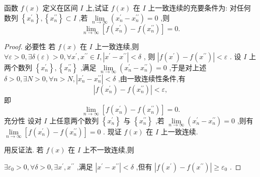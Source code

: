 \begin{example}
函数 \(f\left( x\right)\) 定义在区间 \(I\) 上,试证 \(f\left( x\right)\) 在 \(I\) 上一致连续的充要条件为: 对任何数列 \(\left\{  {x}_{n}^{\prime }\right\}  ,\left\{  {x}_{n}^{\prime \prime }\right\}   \subset  I\) ,若 \(\mathop{\lim }\limits_{{n \rightarrow  \infty }}\left( {{x}_{n}^{\prime } - {x}_{n}^{\prime \prime }}\right)  = 0\) ,则
\[
\mathop{\lim }\limits_{{n \rightarrow  \infty }}\left\lbrack  {f\left( {x}_{n}^{\prime }\right)  - f\left( {x}_{n}^{\prime \prime }\right) }\right\rbrack   = 0.
\]
\end{example}

\begin{proof}

必要性 若 \(f\left( x\right)\) 在 \(I\) 上一致连续,则 \(\forall \varepsilon  > 0,\exists \delta \left( \varepsilon \right)  > 0,\forall {x}^{\prime },{x}^{\prime \prime } \in  I,\left| {{x}^{\prime } - {x}^{\prime \prime }}\right|  < \delta\) , 则 \(\left| {f\left( {x}^{\prime }\right)  - f\left( {x}^{\prime \prime }\right) }\right|  < \varepsilon\) . 设 \(I\) 上两个数列 \(\left\{  {x}_{n}^{\prime }\right\}  ,\left\{  {x}_{n}^{\prime \prime }\right\}\) ,满足 \(\mathop{\lim }\limits_{{n \rightarrow  \infty }}\left( {{x}_{n}^{\prime } - {x}_{n}^{\prime \prime }}\right)  = 0\) ,于是对上述 \(\delta  > 0,\exists N > 0,\forall n > N,\left| {{x}_{n}^{\prime } - {x}_{n}^{\prime \prime }}\right|  < \delta\) ,由一致连续性条件,有
\[
\left| {f\left( {x}_{n}^{\prime }\right)  - f\left( {x}_{n}^{\prime \prime }\right) }\right|  < \varepsilon ,
\]
即
\[
\mathop{\lim }\limits_{{n \rightarrow  \infty }}\left\lbrack  {f\left( {x}_{n}^{\prime }\right)  - f\left( {x}_{n}^{\prime \prime }\right) }\right\rbrack   = 0.
\]
充分性 设对 \(I\) 上任意两个数列 \(\left\{  {x}_{n}^{\prime }\right\}\) 与 \(\left\{  {x}_{n}^{\prime \prime }\right\}\) ,若 \(\mathop{\lim }\limits_{{n \rightarrow  \infty }}\left( {{x}_{n}^{\prime } - {x}_{n}^{\prime \prime }}\right)  = 0\) ,则有 \(\mathop{\lim }\limits_{{n \rightarrow  \infty }}\left\lbrack  {f\left( {x}_{n}^{\prime }\right)  - f\left( {x}_{n}^{\prime \prime }\right) }\right\rbrack   = 0\) . 现证 \(f\left( x\right)\) 在 \(I\) 上一致连续.

用反证法. 若 \(f\left( x\right)\) 在 \(I\) 上不一致连续,则

\(\exists {\varepsilon }_{0} > 0,\forall \delta  > 0,\exists {x}^{\prime },{x}^{\prime \prime }\) ,满足 \(\left| {{x}^{\prime } - {x}^{\prime \prime }}\right|  < \delta\) ,但有 \(\left| {f\left( {x}^{\prime }\right)  - f\left( {x}^{\prime \prime }\right) }\right|  \geq  {\varepsilon }_{0}\) .


\end{proof}

